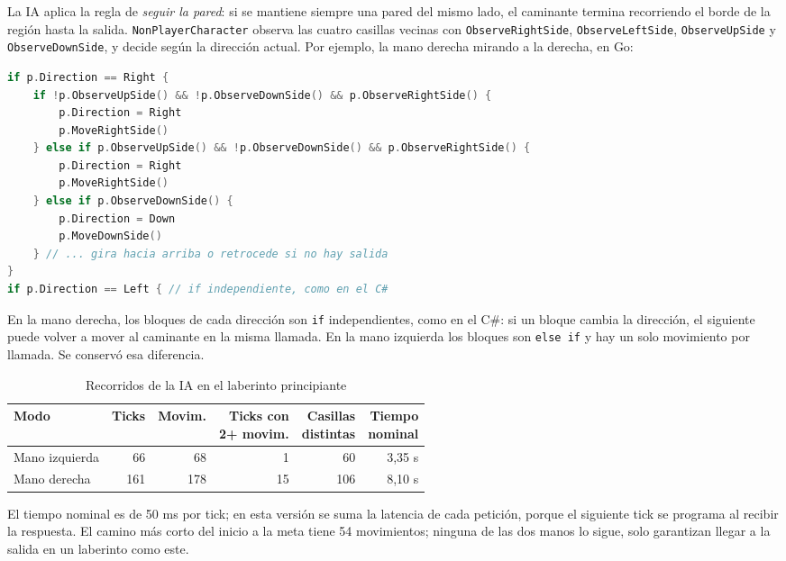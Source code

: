 \documentclass[12pt,a4paper]{article}
\begin{document}
La IA aplica la regla de \emph{seguir la pared}: si se mantiene siempre una pared
del mismo lado, el caminante termina recorriendo el borde de la región hasta la
salida. \texttt{NonPlayerCharacter} observa las cuatro casillas vecinas con
\texttt{ObserveRightSide}, \texttt{ObserveLeftSide}, \texttt{ObserveUpSide} y
\texttt{ObserveDownSide}, y decide según la dirección actual. Por ejemplo, la mano
derecha mirando a la derecha, en Go:

\begin{lstlisting}[language=Go]
if p.Direction == Right {
    if !p.ObserveUpSide() && !p.ObserveDownSide() && p.ObserveRightSide() {
        p.Direction = Right
        p.MoveRightSide()
    } else if p.ObserveUpSide() && !p.ObserveDownSide() && p.ObserveRightSide() {
        p.Direction = Right
        p.MoveRightSide()
    } else if p.ObserveDownSide() {
        p.Direction = Down
        p.MoveDownSide()
    } // ... gira hacia arriba o retrocede si no hay salida
}
if p.Direction == Left { // if independiente, como en el C#
\end{lstlisting}

En la mano derecha, los bloques de cada dirección son \texttt{if} independientes,
como en el C\#: si un bloque cambia la dirección, el siguiente puede volver a mover
al caminante en la misma llamada. En la mano izquierda los bloques son
\texttt{else if} y hay un solo movimiento por llamada. Se conservó esa diferencia.

\begin{table}[H]
\centering\small
\caption{Recorridos de la IA en el laberinto principiante}
\begin{tabular}{lrrrrr}
\toprule
\textbf{Modo} & \textbf{Ticks} & \textbf{Movim.} & \shortstack{\textbf{Ticks con}\\\textbf{2+ movim.}} & \shortstack{\textbf{Casillas}\\\textbf{distintas}} & \shortstack{\textbf{Tiempo}\\\textbf{nominal}}\\
\midrule
Mano izquierda & 66 & 68 & 1 & 60 & 3,35 s\\
Mano derecha & 161 & 178 & 15 & 106 & 8,10 s\\
\bottomrule
\end{tabular}
\end{table}
El tiempo nominal es de 50 ms por tick; en esta versión se suma la latencia de
cada petición, porque el siguiente tick se programa al recibir la respuesta. El
camino más corto del inicio a la meta tiene 54 movimientos; ninguna de las dos
manos lo sigue, solo garantizan llegar a la salida en un laberinto como este.
\end{document}
